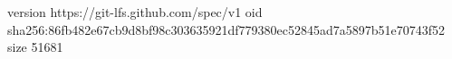 version https://git-lfs.github.com/spec/v1
oid sha256:86fb482e67cb9d8bf98c303635921df779380ec52845ad7a5897b51e70743f52
size 51681
